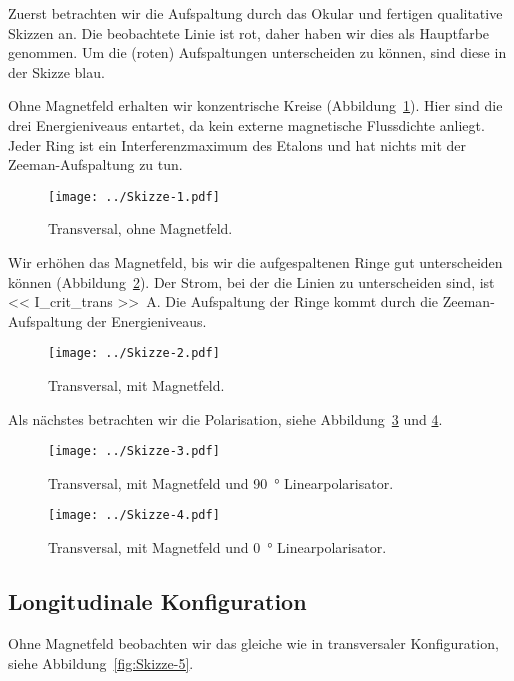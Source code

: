 Zuerst betrachten wir die Aufspaltung durch das Okular und fertigen qualitative
Skizzen an. Die beobachtete Linie ist rot, daher haben wir dies als Hauptfarbe
genommen. Um die (roten) Aufspaltungen unterscheiden zu können, sind diese in
der Skizze blau.

Ohne Magnetfeld erhalten wir konzentrische Kreise
(Abbildung~\ref{fig:Skizze-1}). Hier sind die drei Energieniveaus entartet, da
kein externe magnetische Flussdichte anliegt. Jeder Ring ist ein
Interferenzmaximum des Etalons und hat nichts mit der Zeeman-Aufspaltung zu
tun.

\begin{figure}[htbp]
    \centering
    \texttt{[image: ../Skizze-1.pdf]}
    \caption{%
        Transversal, ohne Magnetfeld.
    }
    \label{fig:Skizze-1}
\end{figure}

Wir erhöhen das Magnetfeld, bis wir die aufgespaltenen Ringe gut unterscheiden
können (Abbildung~\ref{fig:Skizze-2}). Der Strom, bei der die Linien zu
unterscheiden sind, ist \SI{<< I_crit_trans >>}{\ampere}. Die Aufspaltung der
Ringe kommt durch die Zeeman-Aufspaltung der Energieniveaus. 

\begin{figure}[htbp]
    \centering
    \texttt{[image: ../Skizze-2.pdf]}
    \caption{%
        Transversal, mit Magnetfeld.
    }
    \label{fig:Skizze-2}
\end{figure}

Als nächstes betrachten wir die Polarisation, siehe
Abbildung~\ref{fig:Skizze-3} und \ref{fig:Skizze-4}.

\begin{figure}[htbp]
    \centering
    \texttt{[image: ../Skizze-3.pdf]}
    \caption{%
        Transversal, mit Magnetfeld und \SI{90}{\degree} Linearpolarisator.
    }
    \label{fig:Skizze-3}
\end{figure}

\begin{figure}[htbp]
    \centering
    \texttt{[image: ../Skizze-4.pdf]}
    \caption{%
        Transversal, mit Magnetfeld und \SI{0}{\degree} Linearpolarisator.
    }
    \label{fig:Skizze-4}
\end{figure}

\subsection{Longitudinale Konfiguration}

Ohne Magnetfeld beobachten wir das gleiche wie in transversaler Konfiguration,
siehe Abbildung~\ref{fig:Skizze-5}.

